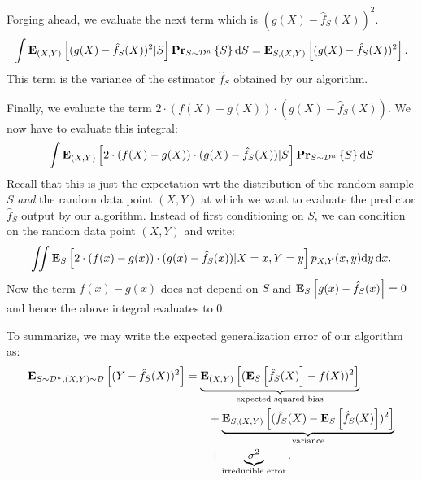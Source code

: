 Forging ahead, we evaluate the next term which is $(g(X) - \hat{f}_S(X))^2$.
\begin{equation}
    \int \mathbf{E}_{(X, Y)} \left [ (g(X) - \hat{f}_S(X))^2 \vert S \right ] \mathbf{Pr}_{S \sim \mathcal{D}^n} \left \{ S \right \} \text{d} S
    = \mathbf{E}_{S, (X, Y)} \left [ (g(X) - \hat{f}_S(X))^2 \right ].
\end{equation}
This term is the variance of the estimator $\hat{f}_S$ obtained by our algorithm.

Finally, we evaluate the term $2 \cdot (f(X) - g(X)) \cdot (g(X) - \hat{f}_S(X))$. We now
have to evaluate this integral:
\begin{equation}
    \int \mathbf{E}_{(X, Y)} \left [ 2 \cdot (f(X) - g(X)) \cdot (g(X) - \hat{f}_S(X)) \vert S \right ] \mathbf{Pr}_{S \sim \mathcal{D}^n} \left \{ S \right \} \text{d} S
\end{equation}
Recall that this is just the expectation wrt the distribution of the random sample
$S$ \emph{and} the random data point $(X, Y)$ at which we want to evaluate the predictor
$\hat{f}_S$ output by our algorithm. Instead of first conditioning on $S$, we can condition
on the random data point $(X, Y)$ and write:
\begin{equation}
    \iint \mathbf{E}_{S} \left [ 2 \cdot (f(x) - g(x)) \cdot (g(x) - \hat{f}_S(x)) \vert X = x, Y = y \right ] p_{X, Y}(x, y) \text{d} y \, \text{d} x.
\end{equation}
Now the term $f(x) - g(x)$ does not depend on $S$ and $\mathbf{E}_{S} \left [ g(x) - \hat{f}_S(x) \right ] = 0$
and hence the above integral evaluates to $0$.

To summarize, we may write the expected generalization error of our algorithm
as:
\begin{align*}
    \mathbf{E}_{S \sim \mathcal{D}^n, (X, Y) \sim \mathcal{D}} \left [ (Y - \hat{f}_S(X))^2 \right ]
        & =  \underbrace{\mathbf{E}_{(X, Y)} \left [ (\mathbf{E}_{S} \left [ \hat{f}_S(X) \right ] - f(X) )^2 \right ]}_{\text{expected squared bias}}  \\
        & \quad \quad + \underbrace{\mathbf{E}_{S, (X, Y)} \left [ ( \hat{f}_S(X) - \mathbf{E}_{S} \left [ \hat{f}_S(X) \right ] )^2 \right ]}_{\text{variance}} \\
        & \quad \quad + \underbrace{\sigma^2}_{\text{irreducible error}}.
\end{align*}
